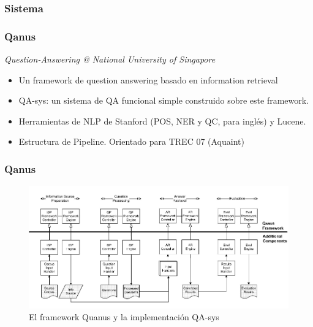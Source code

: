 

\subsubsection*{Sistema}

\begin{frame}[<+->]
\frametitle{Qanus}
  \begin{alertblock}{\textit{Question-Answering @ National University of Singapore}}
  \begin{itemize}
    \item Un framework de question answering basado en information retrieval
    \item QA-sys: un sistema de QA funcional simple construido sobre este framework. 
    \item Herramientas de NLP de Stanford (POS, NER y QC, para inglés) y Lucene. 
    \item Estructura de Pipeline. Orientado para TREC 07 (Aquaint)
  \end{itemize}
  \end{alertblock}
\end{frame}

\begin{frame}
\frametitle{Qanus}
  \begin{figure}
      \includegraphics[scale=0.7]{graficos/Quanus}
    \caption{El framework Quanus y la implementación QA-sys}
    \label{fig:Quanus}
  \end{figure}
\end{frame}


